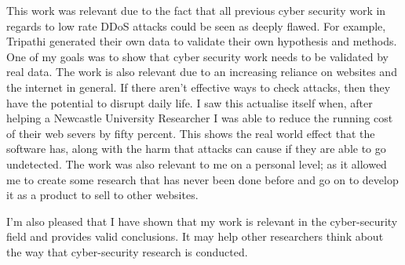 This work was relevant due to the fact that all previous cyber security work in regards to low rate DDoS attacks could be seen as deeply flawed. For example, Tripathi generated their own data to validate their own hypothesis and methods. One of my goals was to show that cyber security work needs to be validated by real data. The work is also relevant due to an increasing reliance on websites and the internet in general. If there aren't effective ways to check attacks, then they have the potential to disrupt daily life. I saw this actualise itself when, after helping a Newcastle University Researcher I was able to reduce the running cost of their web severs by fifty percent. This shows the real world effect that the software has, along with the harm that attacks can cause if they are able to go undetected. The work was also relevant to me on a personal level; as it allowed me to create some research that has never been done before and go on to develop it as a product to sell to other websites.


I'm also pleased that I have shown that my work is relevant in the cyber-security field and provides valid conclusions. It may help other researchers think about the way that cyber-security research is conducted.